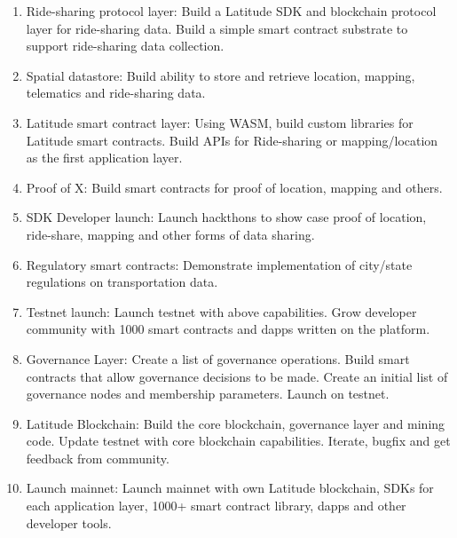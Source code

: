 \begin{enumerate}
    \item Ride-sharing protocol layer: Build a Latitude SDK and blockchain protocol layer for ride-sharing data. Build a
        simple smart contract substrate to support ride-sharing data collection.
    \item Spatial datastore: Build ability to store and retrieve location, mapping, telematics and ride-sharing data.
    \item Latitude smart contract layer: Using WASM, build custom libraries for Latitude smart contracts. Build APIs for
        Ride-sharing or mapping/location as the first application layer.
    \item Proof of X: Build smart contracts for proof of location, mapping and others.
    \item SDK Developer launch: Launch hackthons to show case proof of location, ride-share, mapping and other forms of
        data sharing.
    \item Regulatory smart contracts: Demonstrate implementation of city/state regulations on transportation data.
    \item Testnet launch: Launch testnet with above capabilities. Grow developer community with 1000 smart contracts and
        dapps written on the platform.
    \item Governance Layer: Create a list of governance operations. Build smart contracts that allow governance
        decisions to be made. Create an initial list of governance nodes and membership parameters. Launch on testnet.
    \item Latitude Blockchain: Build the core blockchain, governance layer and mining code. Update testnet with core
        blockchain capabilities. Iterate, bugfix and get feedback from community.
    \item Launch mainnet: Launch mainnet with own Latitude blockchain, SDKs for each application layer, 1000+ smart
        contract library, dapps and other developer tools.
\end{enumerate}

